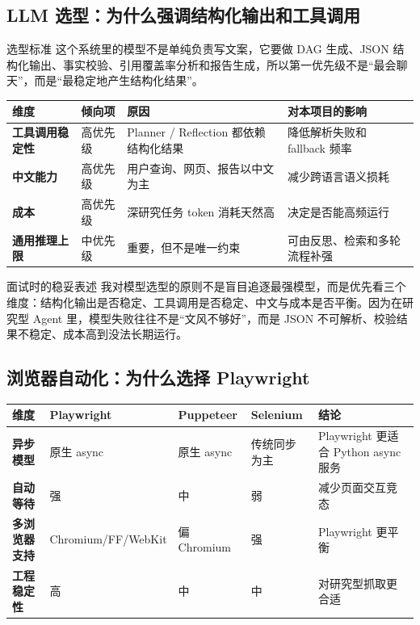 \documentclass[12pt]{article}
\begin{document}
\subsection{LLM 选型：为什么强调结构化输出和工具调用}
\begin{summaryBox}{选型标准}
这个系统里的模型不是单纯负责写文案，它要做 DAG 生成、JSON 结构化输出、事实校验、引用覆盖率分析和报告生成，所以第一优先级不是“最会聊天”，而是“最稳定地产生结构化结果”。
\end{summaryBox}

\begin{center}
\small
\begin{tabularx}{\textwidth}{>{\bfseries}lXXX}
\toprule
维度 & 倾向项 & 原因 & 对本项目的影响 \\
\midrule
工具调用稳定性 & 高优先级 & Planner / Reflection 都依赖结构化结果 & 降低解析失败和 fallback 频率 \\
中文能力 & 高优先级 & 用户查询、网页、报告以中文为主 & 减少跨语言语义损耗 \\
成本 & 高优先级 & 深研究任务 token 消耗天然高 & 决定是否能高频运行 \\
通用推理上限 & 中优先级 & 重要，但不是唯一约束 & 可由反思、检索和多轮流程补强 \\
\bottomrule
\end{tabularx}
\end{center}

\begin{qaBox}{面试时的稳妥表述}
我对模型选型的原则不是盲目追逐最强模型，而是优先看三个维度：结构化输出是否稳定、工具调用是否稳定、中文与成本是否平衡。因为在研究型 Agent 里，模型失败往往不是“文风不够好”，而是 JSON 不可解析、校验结果不稳定、成本高到没法长期运行。
\end{qaBox}

\subsection{浏览器自动化：为什么选择 Playwright}
\begin{center}
\small
\begin{tabularx}{\textwidth}{>{\bfseries}lXXXX}
\toprule
维度 & Playwright & Puppeteer & Selenium & 结论 \\
\midrule
异步模型 & 原生 async & 原生 async & 传统同步为主 & Playwright 更适合 Python async 服务 \\
自动等待 & 强 & 中 & 弱 & 减少页面交互竞态 \\
多浏览器支持 & Chromium/FF/WebKit & 偏 Chromium & 强 & Playwright 更平衡 \\
工程稳定性 & 高 & 中 & 中 & 对研究型抓取更合适 \\
\bottomrule
\end{tabularx}
\end{center}
\end{document}
